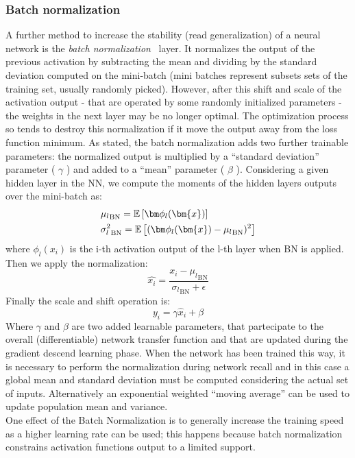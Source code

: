 \subsubsection{Batch normalization}
A further method to increase the stability (read generalization) of a neural network is the \textit{batch normalization}~\cite{ioffe2015batch} layer. It normalizes the output of the previous activation by subtracting the mean and dividing by the standard deviation computed on the mini-batch (mini batches represent subsets sets of the training set, usually randomly picked).  However, after this shift and scale of the activation output - that are operated by some randomly initialized parameters - the weights in the next layer may be no longer optimal. The optimization process so tends to destroy this normalization if it move the output away from the loss function minimum.
As stated, the batch normalization adds two further trainable parameters: the normalized output is multiplied by a “standard deviation” parameter ( $\gamma$ ) and added to a “mean” parameter ( $\beta$ ). 
Considering a given hidden layer in the NN, we compute the moments of the hidden layers outputs over the mini-batch as:
\begin{align*}
    & {\mu_l}_{\text{BN}} = \expectation{\bm\phi_l(\bm{x})} \\
    & {\sigma^2_l}_{\text{BN}} = \expectation{ (\bm\phi_l(\bm{x}) - {\mu_l}_{\text{BN}})^2 }
\end{align*}
where $\phi_l(x_i)$ is the i-th activation output of the l-th layer when BN is applied.
Then we apply the normalization:
\begin{equation}
    \hat{x_i} = \frac{x_i - {\mu_l}_{\text{BN}}}{ {\sigma_l}_{\text{BN}} + \epsilon }
\end{equation}
Finally the scale and shift operation is:
\begin{equation}
    y_i = \gamma \hat x_i + \beta
\end{equation}
Where $\gamma$ and $\beta$ are two added learnable parameters, that partecipate to the overall (differentiable) network transfer function and that are updated during the gradient descend learning phase. When the network has been trained this way, it is necessary to perform the normalization during network recall and in this case a global mean and standard deviation must be computed considering the actual set of inputs. Alternatively an exponential weighted “moving average” can be used to update population mean and variance. \\
One effect of the Batch Normalization is to generally increase the training speed as a higher learning rate can be used; this happens because batch normalization constrains activation functions output to a limited support. 

